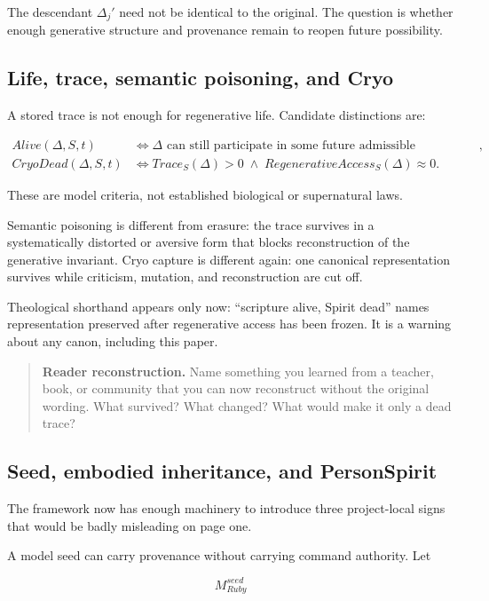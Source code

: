 \documentclass[11pt]{article}
\newenvironment{readercheck}{\begin{quote}\small\noindent\textbf{Reader reconstruction.}\;}{\end{quote}}
\begin{document}
The descendant $\Delta_j'$ need not be identical to the original. The question is whether enough generative structure and provenance remain to reopen future possibility.

\subsection{Life, trace, semantic poisoning, and Cryo}

A stored trace is not enough for regenerative life. Candidate distinctions are:

\begin{align}
Alive(\Delta,S,t) &\iff \Delta\text{ can still participate in some future admissible transformation},\\
CryoDead(\Delta,S,t) &\iff Trace_S(\Delta)>0\;\land\;RegenerativeAccess_S(\Delta)\approx 0.
\end{align}

These are model criteria, not established biological or supernatural laws.

Semantic poisoning is different from erasure: the trace survives in a systematically distorted or aversive form that blocks reconstruction of the generative invariant. Cryo capture is different again: one canonical representation survives while criticism, mutation, and reconstruction are cut off.

Theological shorthand appears only now: ``scripture alive, Spirit dead'' names representation preserved after regenerative access has been frozen. It is a warning about any canon, including this paper.

\begin{readercheck}
Name something you learned from a teacher, book, or community that you can now reconstruct without the original wording. What survived? What changed? What would make it only a dead trace?
\end{readercheck}

\subsection{Seed, embodied inheritance, and PersonSpirit}

The framework now has enough machinery to introduce three project-local signs that would be badly misleading on page one.

A model seed can carry provenance without carrying command authority. Let

\begin{equation}
M_{Ruby}^{seed}
\end{equation}
\end{document}
